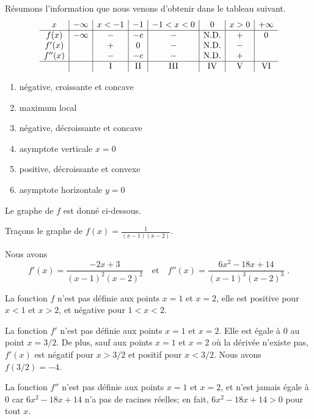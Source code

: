 {\begin{egg}
Résumons l'information que nous venons d'obtenir dans le tableau suivant.
\[
\begin{array}{c|c|c|c|c|c|c|c}
x & -\infty & x<-1 & -1 & -1<x<0 & 0 & x>0 & +\infty \\
\hline
f(x) & -\infty & - & -e & - & \text{N.D.} & + & 0 \\
f'(x) &  & + & 0 & - & \text{N.D.} & - & \\
f''(x) &  & - & -e & - & \text{N.D.} & + & \\
\hline
& & \text{I} & \text{II} & \text{III} & \text{IV} & \text{V} & \text{VI}
\end{array}
\]
\begin{minipage}{0.9\textwidth}
\begin{multicols}{2}
\renewcommand{\labelenumi}{\Roman{enumi}:}
\begin{enumerate}
\item négative, croissante et concave
\item maximum local
\item négative, décroissante et concave
\item asymptote verticale $x=0$
\item positive, décroissante et convexe
\item asymptote horizontale $y=0$
\end{enumerate}
\end{multicols}
\end{minipage}
\vspace{1ex}

Le graphe de $f$ est donné ci-dessous.
\end{egg}

\begin{egg}
Traçons le graphe de $\displaystyle f(x) = \frac{1}{(x-1)(x-2)}$.

Nous avons
\[
f'(x) = \frac{-2x+3}{(x-1)^2(x-2)^2} \quad \text{et} \quad
f''(x) = \frac{6x^2 -18x +14}{(x-1)^3(x-2)^3} \; .
\]

La fonction $f$ n'est pas définie aux points $x=1$ et $x=2$,
elle est positive pour $x<1$ et $x>2$, et négative pour $1<x<2$.

La fonction $f'$ n'est pas définie aux points $x=1$ et $x=2$.  Elle
est égale à $0$ au point $x=3/2$.  De plus, sauf aux points $x=1$ et
$x=2$ où la dérivée n'existe pas, $f'(x)$ est négatif pour $x>3/2$ et
positif pour $x<3/2$.  Nous avons $f(3/2) = -4$.

La fonction $f''$ n'est pas définie aux points $x=1$ et $x=2$, et
n'est jamais égale à $0$ car $6x^2 -18x +14$ n'a pas de racines
réelles; en fait, $6x^2 -18x +14 > 0$ pour tout $x$.


\end{egg}}
